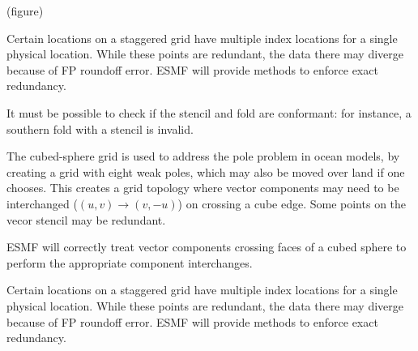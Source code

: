 (figure)



Certain locations on a staggered grid have multiple index locations
for a single physical location. While these points are redundant, the
data there may diverge because of FP roundoff error. ESMF will provide
methods to enforce exact redundancy.


It must be possible to check if the stencil and fold are conformant:
for instance, a southern fold with a \bgridne stencil is
invalid.


The cubed-sphere grid \cite{ref:rpm1996} is used to address the pole
problem in ocean models, by creating a grid with eight weak poles,
which may also be moved over land if one chooses. This creates a grid
topology where vector components may need to be interchanged
($(u,v)\longrightarrow(v,-u)$) on crossing a cube edge. Some points on
the vecor stencil may be redundant.


ESMF will correctly treat vector components crossing faces of a cubed
sphere to perform the appropriate component interchanges.


Certain locations on a staggered grid have multiple index locations
for a single physical location. While these points are redundant, the
data there may diverge because of FP roundoff error. ESMF will provide
methods to enforce exact redundancy.







